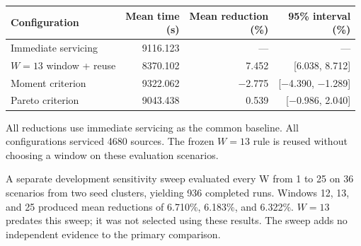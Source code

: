 \documentclass[11pt,letterpaper]{article}
\begin{document}
\begin{center}\begin{minipage}{\linewidth}\small
{}
\label{tab:s4}
\begin{tabularx}{\linewidth}{@{}>{\raggedright\arraybackslash}Xrrr@{}}
\toprule
Configuration & \shortstack[l]{Mean time\\(s)} & \shortstack[l]{Mean reduction\\(\%)} & \shortstack[l]{95\% interval\\(\%)} \\
\midrule
Immediate servicing & 9116.123 & --- & --- \\
$W=13$ window + reuse & 8370.102 & 7.452 & [6.038, 8.712] \\
Moment criterion & 9322.062 & \ensuremath{-}2.775 & [\ensuremath{-}4.390, \ensuremath{-}1.289] \\
Pareto criterion & 9043.438 & 0.539 & [\ensuremath{-}0.986, 2.040] \\
\bottomrule
\end{tabularx}
\end{minipage}\end{center}
All reductions use immediate servicing as the common baseline. All configurations serviced 4680 sources. The frozen $W=13$ rule is reused without choosing a window on these evaluation scenarios.


A separate development sensitivity sweep evaluated every W from 1 to 25 on 36 scenarios from two seed clusters, yielding 936 completed runs. Windows 12, 13, and 25 produced mean reductions of 6.710\%, 6.183\%, and 6.322\%. $W=13$ predates this sweep; it was not selected using these results. The sweep adds no independent evidence to the primary comparison.
\end{document}
